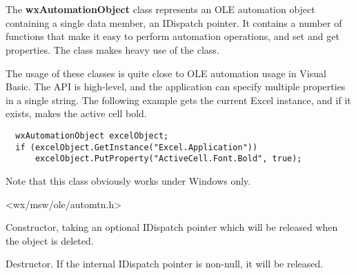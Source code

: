\section{}\label{wxautomationobject}

The {\bf wxAutomationObject} class represents an OLE automation object containing a single data member,
an IDispatch pointer. It contains a number of functions that make it easy to perform
automation operations, and set and get properties. The class makes heavy use of the  class.

The usage of these classes is quite close to OLE automation usage in Visual Basic. The API is
high-level, and the application can specify multiple properties in a single string. The following example
gets the current Excel instance, and if it exists, makes the active cell bold.

{\small
\begin{verbatim}
  wxAutomationObject excelObject;
  if (excelObject.GetInstance("Excel.Application"))
      excelObject.PutProperty("ActiveCell.Font.Bold", true);
\end{verbatim}
}

Note that this class obviously works under Windows only.




<wx/msw/ole/automtn.h>




\label{wxautomationobjectctor}


Constructor, taking an optional IDispatch pointer which will be released when the
object is deleted.

\label{wxautomationobjectdtor}


Destructor. If the internal IDispatch pointer is non-null, it will be released.

\label{wxautomationobjectcallmethod}

